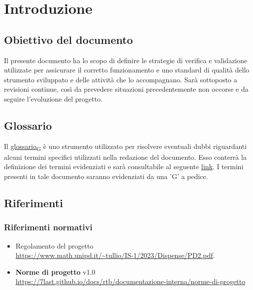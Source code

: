 \section{Introduzione}
\subsection{Obiettivo del documento}
Il presente documento ha lo scopo di definire le strategie di verifica e validazione utilizzate per assicurare il corretto funzionamento e uno standard di qualità dello strumento sviluppato e delle
attività che lo accompagnano.  Sarà sottoposto a revisioni continue, così da prevedere situazioni precedentemente non occorse e da seguire l'evoluzione del progetto.

\subsection{Glossario}
Il \href{https://7last.github.io/docs/rtb/documentazione-interna/glossario\#glossario}{glossario\textsubscript{G}} è uno strumento utilizzato per risolvere eventuali dubbi riguardanti
alcuni termini specifici utilizzati nella redazione del documento.
Esso conterrà la definizione dei termini evidenziati e sarà consultabile al seguente \underline{\href{https://7last.github.io/docs/rtb/documentazione-interna/glossario}{link}}. I termini presenti in tale documento saranno evidenziati da una 'G' a pedice.

\subsection{Riferimenti}
\subsubsection{Riferimenti normativi}
\begin{itemize}
    \item Regolamento del progetto \\
        \url{https://www.math.unipd.it/~tullio/IS-1/2023/Dispense/PD2.pdf}.
    \item \textbf{Norme di progetto} v1.0 \\
        \url{https://7last.github.io/docs/rtb/documentazione-interna/norme-di-progetto}
\end{itemize}
